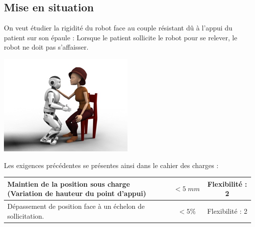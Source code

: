 \documentclass[10pt]{article}
\begin{document}
\subsection*{Mise en situation}
\begin{minipage}[c]{.72\linewidth}
\begin{obj}
On veut étudier la rigidité du robot face au couple résistant dû à l'appui du patient sur son épaule : 
Lorsque le patient sollicite le robot pour se relever, le robot ne doit pas s'affaisser. 
\end{obj}

\end{minipage} \hfill
\begin{minipage}[c]{.25\linewidth}
\begin{center}
\includegraphics[width=\textwidth]{images/Fig00}
\end{center}
\end{minipage} 

Les exigences précédentes se présentes ainsi dans le cahier des charges : 

\begin{center}
\begin{tabular}{|p{12cm}|c|c|}
\hline
Maintien de la position sous charge (Variation de hauteur du point d'appui) & $<5\; mm$ & Flexibilité : 2 \\
\hline
Dépassement de position face à un échelon de sollicitation. & $<5\%$ & Flexibilité : 2 \\
\hline
\end{tabular}
\end{center}
\end{document}
